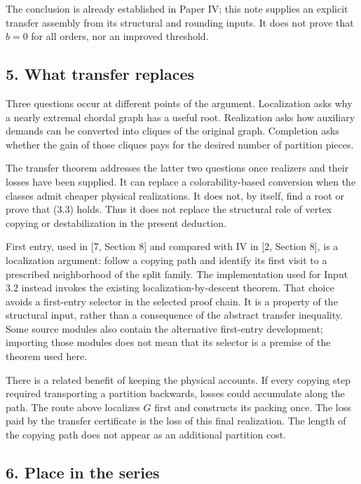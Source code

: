 \documentclass[english,11pt,a4paper]{article}
\begin{document}
The conclusion is already established in Paper IV; this note supplies an
explicit transfer assembly from its structural and rounding inputs. It
does not prove that \(b=0\) for all orders, nor an improved threshold.

\subsection{5. What transfer replaces}\label{what-transfer-replaces}

Three questions occur at different points of the argument. Localization
asks why a nearly extremal chordal graph has a useful root. Realization
asks how auxiliary demands can be converted into cliques of the original
graph. Completion asks whether the gain of those cliques pays for the
desired number of partition pieces.

The transfer theorem addresses the latter two questions once realizers
and their losses have been supplied. It can replace a colorability-based
conversion when the classes admit cheaper physical realizations. It does
not, by itself, find a root or prove that (3.3) holds. Thus it does not
replace the structural role of vertex copying or destabilization in the
present deduction.

First entry, used in {[}7, Section 8{]} and compared with IV in {[}2,
Section 8{]}, is a localization argument: follow a copying path and
identify its first visit to a prescribed neighborhood of the split
family. The implementation used for Input 3.2 instead invokes the
existing localization-by-descent theorem. That choice avoids a
first-entry selector in the selected proof chain. It is a property of
the structural input, rather than a consequence of the abstract transfer
inequality. Some source modules also contain the alternative first-entry
development; importing those modules does not mean that its selector is
a premise of the theorem used here.

There is a related benefit of keeping the physical accounts. If every
copying step required transporting a partition backwards, losses could
accumulate along the path. The route above localizes \(G\) first and
constructs its packing once. The loss paid by the transfer certificate
is the loss of this final realization. The length of the copying path
does not appear as an additional partition cost.

\subsection{6. Place in the series}\label{place-in-the-series}
\end{document}
